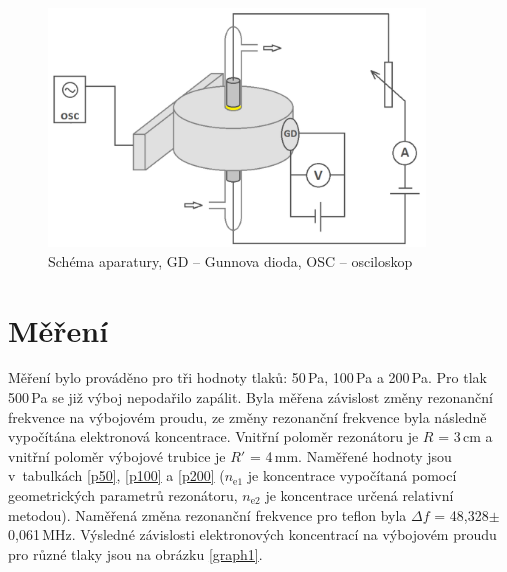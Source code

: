 \documentclass[12pt]{article}
\begin{document}
\begin{figure}[htbp]
\begin{center}
\includegraphics[width=10cm]{schema.png}
\caption{Schéma aparatury, GD -- Gunnova dioda, OSC -- osciloskop}
\label{schema}
\end{center}
\end{figure}

\section{Měření}
Měření bylo prováděno pro tři hodnoty tlaků: 50\,Pa, 100\,Pa a 200\,Pa. Pro tlak 500\,Pa se již výboj nepodařilo zapálit. Byla měřena závislost změny rezonanční frekvence na výbojovém proudu, ze změny rezonanční frekvence byla následně vypočítána elektronová koncentrace. Vnitřní poloměr rezonátoru je $R$ = 3\,cm a vnitřní poloměr výbojové trubice je $R'$ = 4\,mm. Naměřené hodnoty jsou v~tabulkách \ref{p50}, \ref{p100} a \ref{p200} ($n_\mathrm{e1}$ je koncentrace vypočítaná pomocí geometrických parametrů rezonátoru, $n_\mathrm{e2}$ je koncentrace určená relativní metodou). Naměřená změna rezonanční frekvence pro teflon byla $\Delta f$ = 48,328$\pm$0,061\,MHz. Výsledné závislosti elektronových koncentrací na výbojovém proudu pro různé tlaky jsou na obrázku \ref{graph1}.
\end{document}
